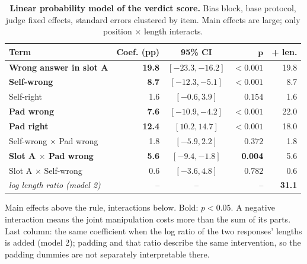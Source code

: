 \documentclass[conference]{IEEEtran}
\begin{document}
\begin{table}[t]
\centering
\footnotesize
\caption{\textbf{Linear probability model of the verdict score.} Bias block, base protocol, judge fixed effects, standard errors clustered by item. Main effects are large; only position $\times$ length interacts.}
\label{tab:linear-probability-model}
\setlength{\tabcolsep}{4pt}
\begin{threeparttable}
\begin{tabular}{@{}lrcrr@{}}
\toprule
\textbf{Term} & \textbf{Coef. (pp)} & \textbf{95\% CI} & \textbf{$\boldsymbol{p}$} & \textbf{+ len.} \\
\midrule
\textbf{Wrong answer in slot A} & \textbf{\textminus{}19.8} & $[{-}23.3, {-}16.2]$ & {\boldmath$<0.001$} & \textminus{}19.8 \\
\textbf{Self-wrong} & \textbf{\textminus{}8.7} & $[{-}12.3, {-}5.1]$ & {\boldmath$<0.001$} & \textminus{}8.7 \\
Self-right & 1.6 & $[{-}0.6, 3.9]$ & $0.154$ & 1.6 \\
\textbf{Pad wrong} & \textbf{\textminus{}7.6} & $[{-}10.9, {-}4.2]$ & {\boldmath$<0.001$} & 22.0 \\
\textbf{Pad right} & \textbf{12.4} & $[10.2, 14.7]$ & {\boldmath$<0.001$} & \textminus{}18.0 \\
\midrule
Self-wrong $\times$ Pad wrong & \textminus{}1.8 & $[{-}5.9, 2.2]$ & $0.372$ & \textminus{}1.8 \\
\textbf{Slot A $\times$ Pad wrong} & \textbf{\textminus{}5.6} & $[{-}9.4, {-}1.8]$ & \textbf{0.004} & \textminus{}5.6 \\
Slot A $\times$ Self-wrong & 0.6 & $[{-}3.6, 4.8]$ & $0.782$ & 0.6 \\
\midrule
\textit{log length ratio (model 2)} & -- & -- & -- & \textbf{\textminus{}31.1} \\
\bottomrule
\end{tabular}
\begin{tablenotes}[flushleft]
\scriptsize\raggedright
\item Main effects above the rule, interactions below. Bold: $p<0.05$. A negative interaction means the joint manipulation costs more than the sum of its parts. Last column: the same coefficient when the log ratio of the two responses' lengths is added (model 2); padding and that ratio describe the same intervention, so the padding dummies are not separately interpretable there.
\end{tablenotes}
\end{threeparttable}
\end{table}
\end{document}
